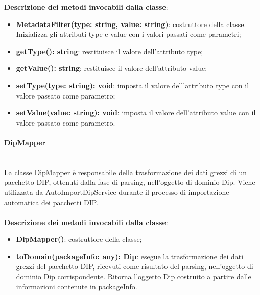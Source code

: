\documentclass[a4paper,12pt]{article}
\begin{document}
{              \noindent \textbf{Descrizione dei metodi invocabili dalla classe}:
                \begin{itemize}
                    \item \textbf{MetadataFilter(type: string, value: string)}: costruttore della classe. Inizializza gli attributi type e value con i valori passati come parametri;
                    \item \textbf{getType(): string}: restituisce il valore dell'attributo type;
                    \item \textbf{getValue(): string}: restituisce il valore dell'attributo value;
                    \item \textbf{setType(type: string): void}: imposta il valore dell'attributo type con il valore passato come parametro;
                    \item \textbf{setValue(value: string): void}: imposta il valore dell'attributo value con il valore passato come parametro.
                \end{itemize}

                \paragraph{DipMapper}\label{par:DipMapper}\mbox{}\\
                La classe DipMapper è responsabile della trasformazione dei dati grezzi di un pacchetto DIP, ottenuti dalla fase di parsing, nell'oggetto di dominio Dip. Viene utilizzata da AutoImportDipService durante il processo di importazione automatica dei pacchetti DIP.\\
                \\
               \noindent \textbf{Descrizione dei metodi invocabili dalla classe}:
                \begin{itemize}
                    \item \textbf{DipMapper()}: costruttore della classe;
                    \item \textbf{toDomain(packageInfo: any): Dip}: esegue la trasformazione dei dati grezzi del pacchetto DIP, ricevuti come risultato del parsing, nell'oggetto di dominio Dip corrispondente. Ritorna l'oggetto Dip costruito a partire dalle informazioni contenute in packageInfo.
                \end{itemize}

}
\end{document}

